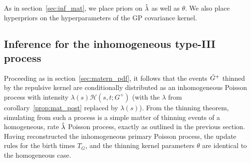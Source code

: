 \documentclass{statsoc}
\begin{document}
As in section~\ref{sec:inf_mat}, we place priors on $\hat{\lambda}$ as well as $\theta$. We also place hyperpriors on the hyperparameters of the GP covariance kernel. 

\subsection{Inference for the inhomogeneous \matern type-III process}



Proceeding as in section~\ref{sec:matern_pdf},
it follows that the events $\tilde{G}^+$ thinned by the repulsive kernel are conditionally distributed as an inhomogeneous Poisson process with 
intensity $\lambda(s) \mathscr{H}(s,t;G^+)$ (with the $\lambda$ from corollary~\ref{prop:mat_post} replaced by $\lambda(s)$). From the thinning theorem, simulating from such a process is a simple matter of thinning events of a homogeneous,
rate $\hat{\lambda}$ Poisson process, exactly as outlined in 
the previous section. Having reconstructed the inhomogeneous primary Poisson process, the update rules for the birth times $T_G$, and the thinning kernel parameters 
$\theta$ are identical to the homogeneous case. 
\end{document}
